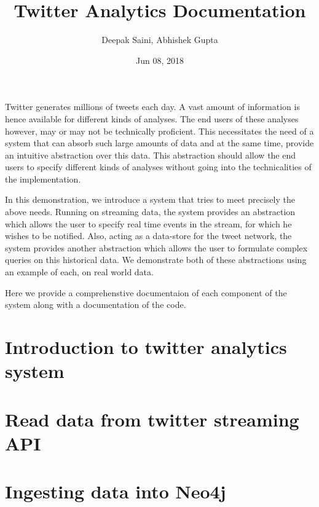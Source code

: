 \documentclass[letterpaper,10pt,english]{sphinxmanual}
\title{Twitter Analytics Documentation}
\date{Jun 08, 2018}
\author{Deepak Saini, Abhishek Gupta}
\begin{document}
\maketitle
\sphinxtableofcontents
{}\label{\detokenize{index::doc}}


Twitter generates millions of tweets each day. A vast amount of information is hence available for different kinds of analyses. The end users of these analyses however, may or may not be technically proficient. This necessitates the need of a system that can absorb such large amounts of data and at the same time, provide an intuitive abstraction over this data. This abstraction should allow the end users to specify different kinds of analyses without going into the technicalities of the implementation.

In this demonstration, we introduce a system that tries to meet precisely the above needs. Running on streaming data, the system provides an abstraction which allows the user to specify real time events in the stream, for which he wishes to be notified. Also, acting as a data-store for the tweet network, the system provides another abstraction which allows the user to formulate complex queries on this historical data. We demonstrate both of these abstractions using an example of each, on real world data.

Here we provide a comprehenstive documentaion of each component of the system along with a documentation of the code.


\chapter{Introduction to twitter analytics system}
\label{\detokenize{introduction:welcome-to-twitter-analytics-documentation}}\label{\detokenize{introduction::doc}}\label{\detokenize{introduction:introduction-to-twitter-analytics-system}}

\chapter{Read data from twitter streaming API}
\label{\detokenize{twitter_stream::doc}}\label{\detokenize{twitter_stream:read-data-from-twitter-streaming-api}}

\chapter{Ingesting data into Neo4j}
\label{\detokenize{neo4j_data_ingestion::doc}}\label{\detokenize{neo4j_data_ingestion:ingesting-data-into-neo4j}}
\end{document}
